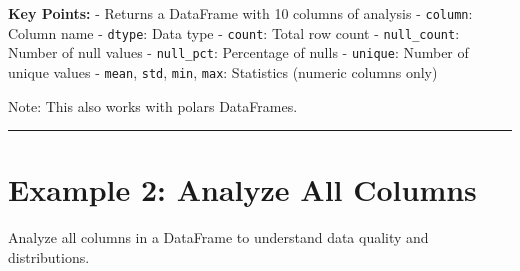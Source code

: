 \documentclass[
  letterpaper,
]{scrbook}
\begin{document}
\textbf{Key Points:} - Returns a DataFrame with 10 columns of analysis -
\texttt{column}: Column name - \texttt{dtype}: Data type -
\texttt{count}: Total row count - \texttt{null\_count}: Number of null
values - \texttt{null\_pct}: Percentage of nulls - \texttt{unique}:
Number of unique values - \texttt{mean}, \texttt{std}, \texttt{min},
\texttt{max}: Statistics (numeric columns only)

Note: This also works with polars DataFrames.

\begin{center}\rule{0.5\linewidth}{0.5pt}\end{center}

\section{Example 2: Analyze All
Columns}\label{example-2-analyze-all-columns}

Analyze all columns in a DataFrame to understand data quality and
distributions.
\end{document}

